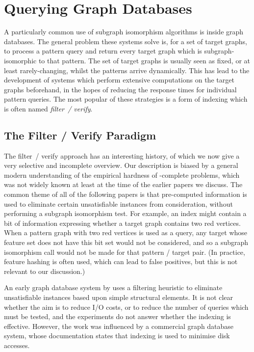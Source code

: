 \documentclass[twoside,11pt]{article}
\newcommand{\citet}[1]{\citeA{#1}}
\newcommand{\citep}[1]{\cite{#1}}
\begin{document}
\section{Querying Graph Databases}\label{section:filterverify}

A particularly common use of subgraph isomorphism algorithms is inside graph databases.  The
general problem these systems solve is, for a set of target graphs, to process a pattern query and
return every target graph which is subgraph-isomorphic to that pattern. The set of target graphs is
usually seen as fixed, or at least rarely-changing, whilst the patterns arrive dynamically. This has
lead to the development of systems which perform extensive computations on the target graphs
beforehand, in the hopes of reducing the response times for individual pattern queries. The most
popular of these strategies is a form of indexing which is often named \emph{filter~/ verify}.

\subsection{The Filter / Verify Paradigm}

The filter~/ verify approach has an interesting history, of which we now give a very selective and
incomplete overview. Our description is biased by a general modern understanding of the empirical
hardness of \NP-complete problems, which was not widely known at least at the time of the earlier
papers we discuss. The common theme of all of the following papers is that pre-computed information
is used to eliminate certain unsatisfiable instances from consideration, without performing a
subgraph isomorphism test. For example, an index might contain a bit of information expressing
whether a target graph contains two red vertices. When a pattern graph with two red vertices is used
as a query, any target whose feature set does not have this bit set would not be considered, and so
a subgraph isomorphism call would not be made for that pattern / target pair. (In practice, feature
hashing is often used, which can lead to false positives, but this is not relevant to our
discussion.)

An early graph database system by \citet{DBLP:conf/pods/ShashaWG02} uses a filtering heuristic to
eliminate unsatisfiable instances based upon simple structural elements. It is not clear whether the
aim is to reduce I/O costs, or to reduce the number of queries which must be tested, and the
experiments do not answer whether the indexing is effective. However, the work was influenced by a commercial
graph database system, whose documentation \citep{o:Daylight} states that indexing is
used to minimise disk accesses.
\end{document}
